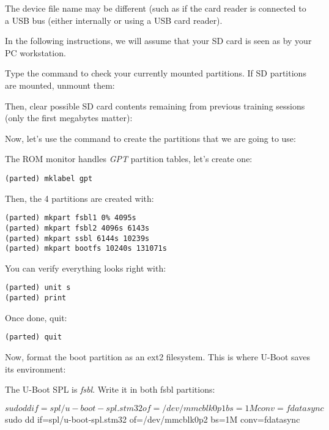 The device file name may be different (such as 
if the card reader is connected to a USB bus (either internally
or using a USB card reader).

In the following instructions, we will assume that your SD card is
seen as  by your PC workstation.

Type the  command to check your currently mounted
partitions. If SD partitions are mounted, unmount them:


Then, clear possible SD card contents remaining from previous
training sessions (only the first megabytes matter):


Now, let's use the  command to create the partitions that
we are going to use:


The ROM monitor handles {\em GPT} partition tables, let's create one:

\begin{verbatim}
(parted) mklabel gpt
\end{verbatim}

Then, the 4 partitions are created with:
\begin{verbatim}
(parted) mkpart fsbl1 0% 4095s
(parted) mkpart fsbl2 4096s 6143s
(parted) mkpart ssbl 6144s 10239s
(parted) mkpart bootfs 10240s 131071s
\end{verbatim}

You can verify everything looks right with:

\begin{verbatim}
(parted) unit s
(parted) print
\end{verbatim}

Once done, quit:
\begin{verbatim}
(parted) quit
\end{verbatim}


Now, format the boot partition as an ext2 filesystem. This is where
U-Boot saves its environment:

The U-Boot SPL is {\em fsbl}. Write it in both fsbl partitions:

\begin{bashinput}
$ sudo dd if=spl/u-boot-spl.stm32 of=/dev/mmcblk0p1 bs=1M conv=fdatasync
$ sudo dd if=spl/u-boot-spl.stm32 of=/dev/mmcblk0p2 bs=1M conv=fdatasync
\end{bashinput}

